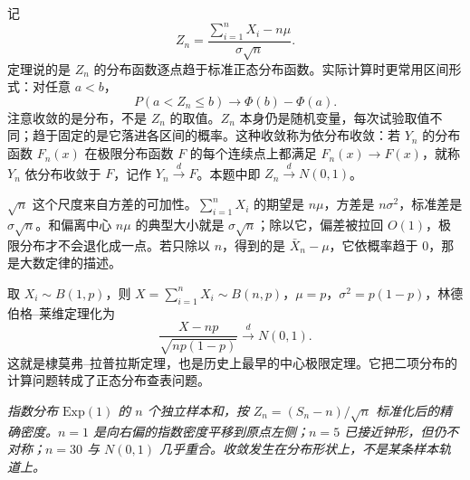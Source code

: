 记
\[
Z_n=\frac{\sum_{i=1}^n X_i-n\mu}{\sigma\sqrt n}.
\]
定理说的是 $Z_n$ 的分布函数逐点趋于标准正态分布函数。实际计算时更常用区间形式：对任意 $a<b$，
\[
P(a<Z_n\le b)\longrightarrow\Phi(b)-\Phi(a).
\]
注意收敛的是分布，不是 $Z_n$ 的取值。$Z_n$ 本身仍是随机变量，每次试验取值不同；趋于固定的是它落进各区间的概率。这种收敛称为依分布收敛：若 $Y_n$ 的分布函数 $F_n(x)$ 在极限分布函数 $F$ 的每个连续点上都满足 $F_n(x)\to F(x)$，就称 $Y_n$ 依分布收敛于 $F$，记作 $Y_n\overset{d}{\longrightarrow}F$。本题中即 $Z_n\overset{d}{\longrightarrow}N(0,1)$。

$\sqrt n$ 这个尺度来自方差的可加性。$\sum_{i=1}^n X_i$ 的期望是 $n\mu$，方差是 $n\sigma^2$，标准差是 $\sigma\sqrt n$。和偏离中心 $n\mu$ 的典型大小就是 $\sigma\sqrt n$；除以它，偏差被拉回 $O(1)$，极限分布才不会退化成一点。若只除以 $n$，得到的是 $\bar X_n-\mu$，它依概率趋于 $0$，那是大数定律的描述。

取 $X_i\sim B(1,p)$，则 $X=\sum_{i=1}^n X_i\sim B(n,p)$，$\mu=p$，$\sigma^2=p(1-p)$，林德伯格--莱维定理化为
\[
\frac{X-np}{\sqrt{np(1-p)}}\overset{d}{\longrightarrow}N(0,1).
\]
这就是棣莫弗--拉普拉斯定理，也是历史上最早的中心极限定理。它把二项分布的计算问题转成了正态分布查表问题。

\begin{center}
\begin{minipage}{\linewidth}
\centering
{}
\par\vspace{3pt}
{\footnotesize\itshape 指数分布 $\mathrm{Exp}(1)$ 的 $n$ 个独立样本和，按 $Z_n=(S_n-n)/\sqrt n$ 标准化后的精确密度。$n=1$ 是向右偏的指数密度平移到原点左侧；$n=5$ 已接近钟形，但仍不对称；$n=30$ 与 $N(0,1)$ 几乎重合。收敛发生在分布形状上，不是某条样本轨道上。}
\end{minipage}
\end{center}

